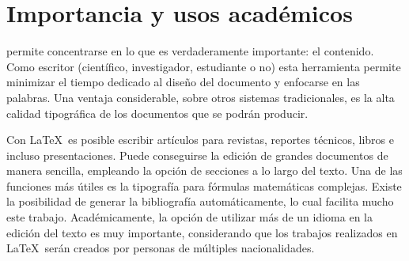 \documentclass[10pt,journal,compsoc]{IEEEtran}
\begin{document}
\section{Importancia y usos acad\'emicos}
 permite concentrarse en lo que es verdaderamente importante: el contenido. Como escritor (cient\'ifico, investigador,  estudiante o no) esta herramienta permite minimizar el tiempo dedicado al diseño del documento y enfocarse en las palabras. Una ventaja considerable, sobre otros sistemas tradicionales, es la alta calidad tipogr\'afica de los documentos que se podr\'an producir.

Con \LaTeX\ es posible escribir art\'iculos para revistas, reportes t\'ecnicos, libros e incluso presentaciones. Puede conseguirse la edici\'on de grandes documentos de manera sencilla, empleando la opci\'on de secciones a lo largo del texto. Una de las funciones m\'as \'utiles es la tipograf\'ia para f\'ormulas matem\'aticas complejas. Existe la posibilidad de generar la bibliograf\'ia autom\'aticamente, lo cual facilita mucho este trabajo. Acad\'emicamente, la opci\'on de utilizar m\'as de un idioma en la edici\'on del texto es muy importante, considerando que los trabajos realizados en \LaTeX\ ser\'an creados por personas de m\'ultiples nacionalidades.
\end{document}
